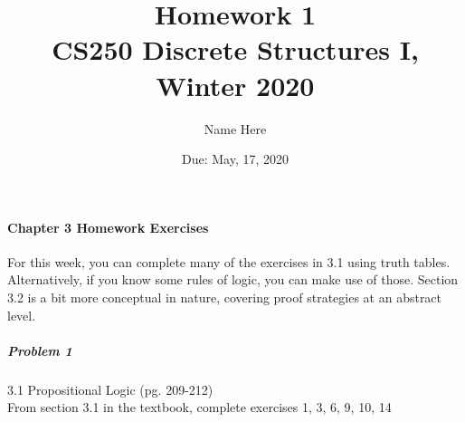 \documentclass[11pt,a4paper]{article}
\title{\bf Homework 1\\[1ex]
\rm\normalsize CS250 Discrete Structures I, Winter 2020 }
\date{\normalsize Due: May, 17, 2020}
\author{\normalsize Name Here}
\begin{document}
 
\vspace{0cm}\maketitle 

	\paragraph{Chapter 3 Homework Exercises} For this week, you can complete many of the exercises in 3.1 using truth tables. Alternatively, if you know some rules of logic, you can make use of those. Section 3.2 is a bit more conceptual in nature, covering proof strategies at an abstract level.
	
	\subparagraph{Problem 1} 3.1 Propositional Logic (pg. 209-212) \\
			
		From section 3.1 in the textbook, complete exercises 1, 3, 6, 9, 10, 14
\end{document}
